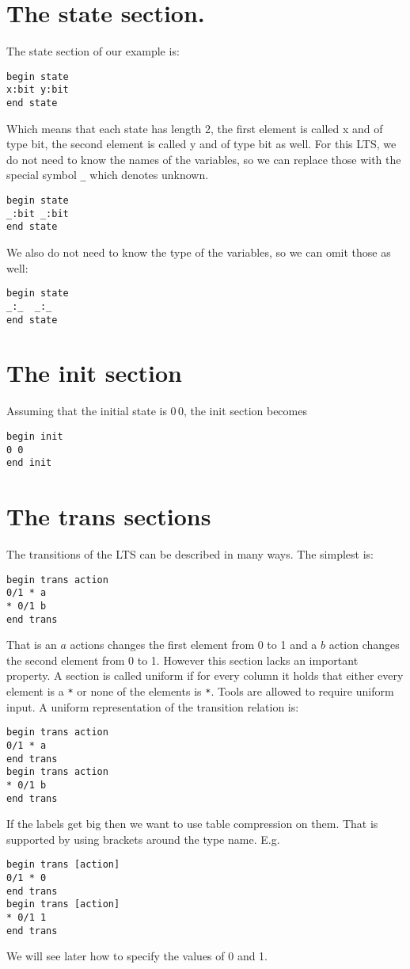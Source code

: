 \section{The state section.}

The state section of our example is:
\begin{verbatim}
begin state
x:bit y:bit
end state
\end{verbatim}
Which means that each state has length 2, the first element is called x and of type bit,
the second element is called y and of type bit as well. For this LTS, we do not need to know the
names of the variables, so we can replace those with the special symbol \verb+_+  which denotes unknown.
\begin{verbatim}
begin state
_:bit _:bit
end state
\end{verbatim}
We also do not need to know the type of the variables, so we can omit those as well:
\begin{verbatim}
begin state
_:_  _:_
end state
\end{verbatim}

\section{The init section}

Assuming that the initial state is $0\,0$, the init section becomes
\begin{verbatim}
begin init
0 0
end init
\end{verbatim}

\section{The trans sections}

The transitions of the LTS can be described in many ways.
The simplest is:

\begin{verbatim}
begin trans action
0/1 * a
* 0/1 b
end trans
\end{verbatim}
That is an $a$ actions changes the first element from 0 to 1 and
a $b$ action changes the second element from 0 to 1. However this section lacks
an important property. A section is called uniform if for every column it
holds that either every element is a \verb+*+ or none of the elements is \verb+*+.
Tools are allowed to require uniform input. A uniform representation
of the transition relation is:
\begin{verbatim}
begin trans action
0/1 * a
end trans
begin trans action
* 0/1 b
end trans
\end{verbatim}
If the labels get big then we want to use table compression on them.
That is supported by using brackets around the type name. E.g.
\begin{verbatim}
begin trans [action]
0/1 * 0
end trans
begin trans [action]
* 0/1 1
end trans
\end{verbatim}
We will see later how to specify the values of 0 and 1.

